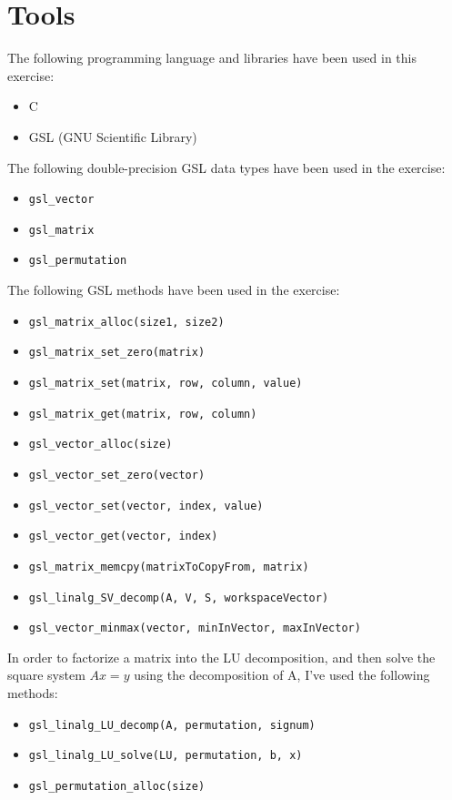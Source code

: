 \documentclass{article}
\newcommand{\code}{\texttt}
\begin{document}
\section{Tools}
The following programming language and libraries have been used in this exercise:
\begin{itemize}
  \item C
  \item GSL (GNU Scientific Library)
\end{itemize}
The following double-precision GSL data types have been used in the exercise:
\begin{itemize}
  \item \code{gsl\_vector}
  \item \code{gsl\_matrix}
  \item \code{gsl\_permutation}
\end{itemize}
The following GSL methods have been used in the exercise:
\begin{itemize}
  \item \code{gsl\_matrix\_alloc(size1, size2)}
  \item \code{gsl\_matrix\_set\_zero(matrix)}
  \item \code{gsl\_matrix\_set(matrix, row, column, value)}
  \item \code{gsl\_matrix\_get(matrix, row, column)}
  \item \code{gsl\_vector\_alloc(size)}
  \item \code{gsl\_vector\_set\_zero(vector)}
  \item \code{gsl\_vector\_set(vector, index, value)}
  \item \code{gsl\_vector\_get(vector, index)}
  \item \code{gsl\_matrix\_memcpy(matrixToCopyFrom, matrix)}
  \item \code{gsl\_linalg\_SV\_decomp(A, V, S, workspaceVector)}
  \item \code{gsl\_vector\_minmax(vector, minInVector, maxInVector)}
\end{itemize}
In order to factorize a matrix into the LU decomposition, and then solve the square system $Ax=y$ using the decomposition of A, I've used the following methods:
\begin{itemize}
  \item \code{gsl\_linalg\_LU\_decomp(A, permutation, signum)}
  \item \code{gsl\_linalg\_LU\_solve(LU, permutation, b, x)}
  \item \code{gsl\_permutation\_alloc(size)}
\end{itemize}
  
\end{document}
